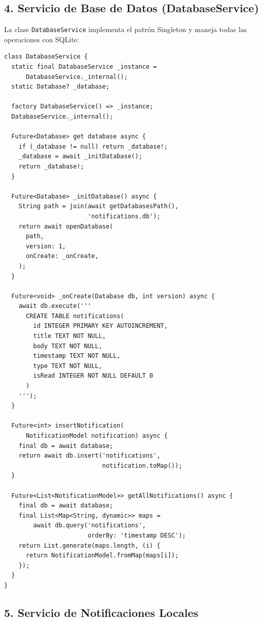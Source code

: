 \documentclass[12pt,a4paper]{article}
\begin{document}
\newpage

\subsection*{4. Servicio de Base de Datos (DatabaseService)}

La clase \texttt{DatabaseService} implementa el patrón Singleton y maneja todas las operaciones con SQLite:

\begin{verbatim}
class DatabaseService {
  static final DatabaseService _instance = 
      DatabaseService._internal();
  static Database? _database;

  factory DatabaseService() => _instance;
  DatabaseService._internal();

  Future<Database> get database async {
    if (_database != null) return _database!;
    _database = await _initDatabase();
    return _database!;
  }

  Future<Database> _initDatabase() async {
    String path = join(await getDatabasesPath(), 
                       'notifications.db');
    return await openDatabase(
      path,
      version: 1,
      onCreate: _onCreate,
    );
  }

  Future<void> _onCreate(Database db, int version) async {
    await db.execute('''
      CREATE TABLE notifications(
        id INTEGER PRIMARY KEY AUTOINCREMENT,
        title TEXT NOT NULL,
        body TEXT NOT NULL,
        timestamp TEXT NOT NULL,
        type TEXT NOT NULL,
        isRead INTEGER NOT NULL DEFAULT 0
      )
    ''');
  }

  Future<int> insertNotification(
      NotificationModel notification) async {
    final db = await database;
    return await db.insert('notifications', 
                           notification.toMap());
  }

  Future<List<NotificationModel>> getAllNotifications() async {
    final db = await database;
    final List<Map<String, dynamic>> maps = 
        await db.query('notifications', 
                       orderBy: 'timestamp DESC');
    return List.generate(maps.length, (i) {
      return NotificationModel.fromMap(maps[i]);
    });
  }
}
\end{verbatim}

\newpage

\subsection*{5. Servicio de Notificaciones Locales}
\end{document}
